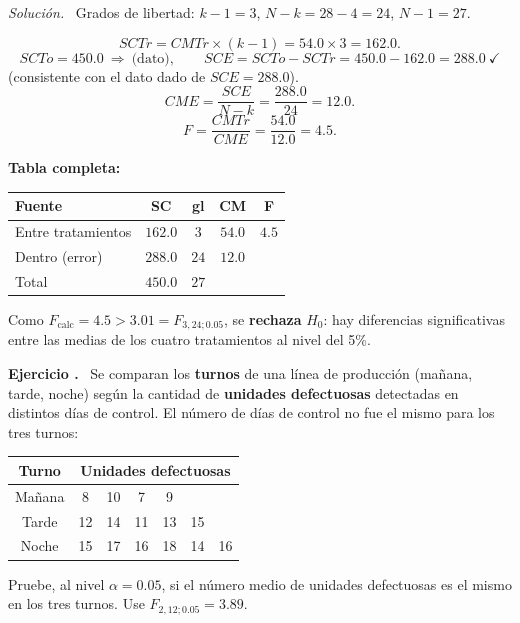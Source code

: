 \documentclass[11pt,a4paper]{article}
\newcounter{ejnum}
\newenvironment{ejercicio}{\refstepcounter{ejnum}\par\medskip\noindent\textbf{Ejercicio \theejnum.}~}{\par}
\newenvironment{solucion}{\par\noindent\textit{Solución.}~}{\par\vspace{1em}}
\begin{document}
\begin{solucion}
Grados de libertad: $k-1=3$, $N-k=28-4=24$, $N-1=27$.

\[
SCTr = CMTr\times(k-1) = 54.0\times3=162.0.
\]
\[
SCTo=450.0 \ \Rightarrow\ \text{(dato)}, \qquad SCE=SCTo-SCTr=450.0-162.0=288.0 \ \checkmark
\]
(consistente con el dato dado de $SCE=288.0$).
\[
CME=\frac{SCE}{N-k}=\frac{288.0}{24}=12.0.
\]
\[
F=\frac{CMTr}{CME}=\frac{54.0}{12.0}=4.5.
\]

\textbf{Tabla completa:}
\begin{table}[htbp]
\centering
\begin{tabular}{lcccc}
\toprule
Fuente & SC & gl & CM & F \\
\midrule
Entre tratamientos & $162.0$ & $3$ & $54.0$ & $4.5$ \\
Dentro (error) & $288.0$ & $24$ & $12.0$ & \\
\midrule
Total & $450.0$ & $27$ & & \\
\bottomrule
\end{tabular}
\end{table}

Como $F_{\text{calc}}=4.5 > 3.01=F_{3,24;0.05}$, se \textbf{rechaza} $H_0$: hay diferencias significativas entre las medias de los cuatro tratamientos al nivel del 5\%.
\end{solucion}

\begin{ejercicio}
Se comparan los \textbf{turnos} de una línea de producción (mañana, tarde, noche) según la cantidad de \textbf{unidades defectuosas} detectadas en distintos días de control. El número de días de control no fue el mismo para los tres turnos:

\begin{table}[htbp]
\centering
\begin{tabular}{c|cccccc}
\toprule
Turno & \multicolumn{6}{c}{Unidades defectuosas} \\
\midrule
Mañana & 8 & 10 & 7 & 9 & & \\
Tarde & 12 & 14 & 11 & 13 & 15 & \\
Noche & 15 & 17 & 16 & 18 & 14 & 16 \\
\bottomrule
\end{tabular}
\end{table}

Pruebe, al nivel $\alpha=0.05$, si el número medio de unidades defectuosas es el mismo en los tres turnos. Use $F_{2,12;0.05}=3.89$.
\end{ejercicio}
\end{document}
